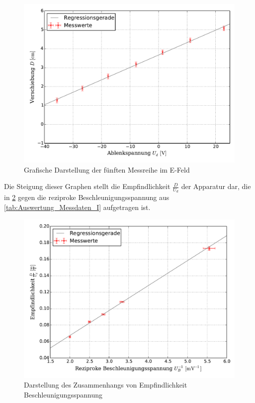 		\begin{figure}[!h]
		\centering
				\includegraphics[scale=0.7]{Grafiken/EFeld_Messreihe_V.pdf}
				\caption{Grafische Darstellung der fünften Messreihe im E-Feld}\label{fig:Auswertung_Messdaten_I_V}
		\end{figure}
		
		Die Steigung dieser Graphen stellt die Empfindlichkeit $\frac{D}{U_{d}}$
		der Apparatur dar, die in \cref{fig:Auswertung_Messdaten_I_VI} gegen die reziproke 
		Beschleunigungsspannung aus \cref{tab:Auswertung_Messdaten_I} aufgetragen ist.
		
		\begin{figure}[!h]
			\includegraphics[scale=0.7]{Grafiken/EFeld_Messreihe_VI.pdf}
			\caption{Darstellung des Zusammenhangs von Empfindlichkeit Beschleunigungsspannung}\label{fig:Auswertung_Messdaten_I_VI}
		\end{figure}
		
